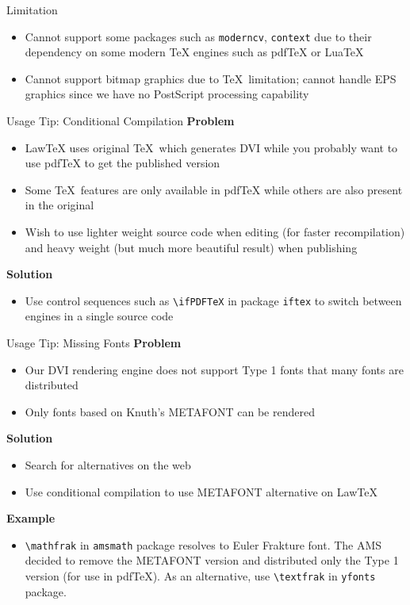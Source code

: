 \documentclass{beamer}
\begin{document}
\begin{frame}{Limitation}
\begin{itemize}
\item Cannot support some packages such as \texttt{moderncv}, \texttt{context} due to their dependency on some modern TeX engines such as pdfTeX or LuaTeX
\item Cannot support bitmap graphics due to \TeX\ limitation; cannot handle EPS graphics since we have no PostScript processing capability
\end{itemize}
\end{frame}

\begin{frame}{Usage Tip: Conditional Compilation}
\textbf{Problem}
\begin{itemize}
\item LawTeX uses original \TeX\ which generates DVI while you probably want to use pdfTeX to get the published version
\item Some \TeX\ features are only available in pdfTeX while others are also present in the original
\item Wish to use lighter weight source code when editing (for faster recompilation) and heavy weight (but much more beautiful result) when publishing
\end{itemize}
\textbf{Solution}
\begin{itemize}
\item Use control sequences such as \texttt{\textbackslash ifPDFTeX} in package \texttt{iftex} to switch between engines in a single source code
\end{itemize}
\end{frame}

\begin{frame}{Usage Tip: Missing Fonts}
\textbf{Problem}
\begin{itemize}
\item Our DVI rendering engine does not support Type 1 fonts that many fonts are distributed
\item Only fonts based on Knuth's METAFONT can be rendered
\end{itemize}
\textbf{Solution}
\begin{itemize}
\item Search for alternatives on the web
\item Use conditional compilation to use METAFONT alternative on LawTeX
\end{itemize}
\textbf{Example}
\begin{itemize}
\item \texttt{\textbackslash mathfrak} in \texttt{amsmath} package resolves to Euler Frakture font. The AMS decided to remove the METAFONT version and distributed only the Type 1 version (for use in pdfTeX). As an alternative, use \texttt{\textbackslash textfrak} in \texttt{yfonts} package.
\end{itemize}
\end{frame}
\end{document}
